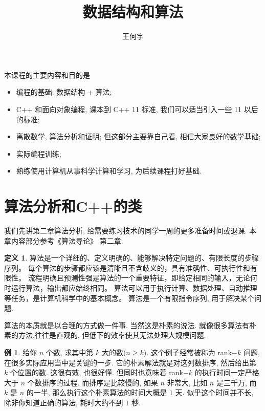 \documentclass[a4paper]{ctexart}
\title{数据结构和算法}
\author{王何宇}
\date{}
\theoremstyle{definition}
\newtheorem{definition}{定义}[section]
\theoremstyle{definition}
\newtheorem{example}{例}[section]
\begin{document}
\maketitle
\pagestyle{empty}



本课程的主要内容和目的是
\begin{itemize}
\item 编程的基础: 数据结构 + 算法;
\item C++ 和面向对象编程, 课本到 C++ 11 标准, 我们可以适当引入一些 11 以后的标准;
\item 离散数学, 算法分析和证明; 但这部分主要靠自己看, 相信大家良好的数学基础; 
\item 实际编程训练;
\item 熟练使用计算机从事科学计算和学习, 为后续课程打好基础.
\end{itemize}


\section{算法分析和C++的类}
我们先讲第二章算法分析, 给需要练习技术的同学一周的更多准备时间或退课. 本章内容部分参考《算法导论》\cite{cormen2022introduction} 第二章.

\begin{definition}
  算法是一个详细的、定义明确的、能够解决特定问题的、有限长度的步骤序列。
  每个算法的步骤都应该是清晰且不含歧义的，具有准确性、可执行性和有限性。 
  流程明确且预测性强是算法的一个重要特征，即给定相同的输入，无论何时运行算法，输出都应始终相同。 
  算法可以用于执行计算、数据处理、自动推理等任务，是计算机科学中的基本概念。  算法是一个有限指令序列, 用于解决某个问题.
\end{definition}
  
算法的本质就是以合理的方式做一件事. 当然这是朴素的说法.
就像很多算法有朴素的方法,往往是直观的,
但低下的效率使其无法处理大规模问题.

\begin{example}
给你 $n$ 个数, 求其中第 $k$ 大的数($n \geq k$).
这个例子经常被称为 rank$-k$ 问题,在很多实际应用当中是关键的一步.
它的朴素解法就是对这列数排序, 然后给出第 $k$ 个位置的数. 这很有效,
也很好懂. 但同时也意味着 rank$-k$ 的执行时间一定严格大于 $n$ 个数排序的过程.
而排序是比较慢的, 如果 $n$ 非常大, 比如 $n$ 是三千万, 而 $k$ 是 $n$ 的一半,
那么执行这个朴素算法的时间大概是 $1$ 天. 似乎这个时间并不长, 除非你知道正确的算法,
耗时大约不到 $1$ 秒.
\end{example}
\end{document}
